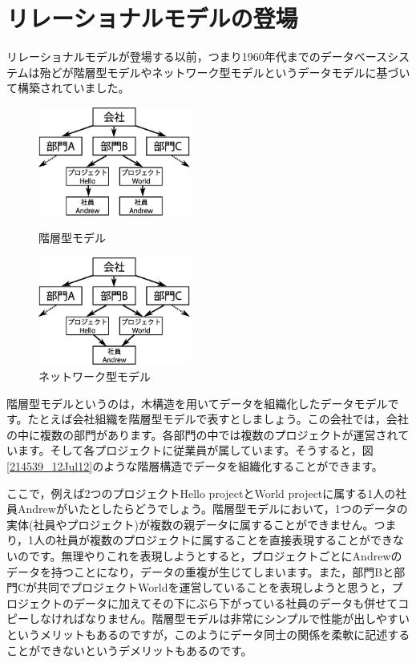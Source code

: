 \section{リレーショナルモデルの登場}


リレーショナルモデルが登場する以前，つまり1960年代までのデータベースシステムは殆どが階層型モデルやネットワーク型モデルというデータモデルに基づいて構築されていました。


\begin{figure}[tb]
 \begin{minipage}{0.48\textwidth}
  \begin{center}
   \includegraphics[width=5cm]{images/hierarchical-data-model.eps}
   \caption{階層型モデル}
   \label{214539_12Jul12}
  \end{center}
 \end{minipage}
 \begin{minipage}{0.48\textwidth}
  \begin{center}
   \includegraphics[width=5cm]{images/network-data-model.eps}
   \caption{ネットワーク型モデル}
   \label{214707_12Jul12}
  \end{center}
 \end{minipage}
 \vspace*{-0.1\Cvs}
\end{figure}


階層型モデルというのは，木構造を用いてデータを組織化したデータモデルです。たとえば会社組織を階層型モデルで表すとしましょう。この会社では，会社の中に複数の部門があります。各部門の中では複数のプロジェクトが運営されています。そして各プロジェクトに従業員が属しています。そうすると，図\ref{214539_12Jul12}のような階層構造でデータを組織化することができます。


ここで，例えば2つのプロジェクトHello projectとWorld projectに属する1人の社員Andrewがいたとしたらどうでしょう。階層型モデルにおいて，1つのデータの実体(社員やプロジェクト)が複数の親データに属することができません。つまり，1人の社員が複数のプロジェクトに属することを直接表現することができないのです。無理やりこれを表現しようとすると，プロジェクトごとにAndrewのデータを持つことになり，データの重複が生じてしまいます。また，部門Bと部門Cが共同でプロジェクトWorldを運営していることを表現しようと思うと，プロジェクトのデータに加えてその下にぶら下がっている社員のデータも併せてコピーしなければなりません。階層型モデルは非常にシンプルで性能が出しやすいというメリットもあるのですが，このようにデータ同士の関係を柔軟に記述することができないというデメリットもあるのです。


